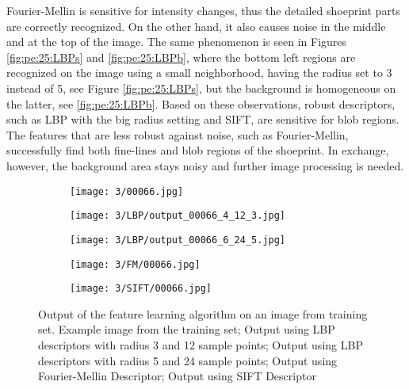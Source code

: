 \documentclass[draft,final]{vutinfth} %
\begin{document}
Fourier-Mellin is sensitive for intensity changes, thus the detailed shoeprint parts are correctly recognized.
On the other hand, it also causes noise in the middle and at the top of the image.
The same phenomenon is seen in Figures  \ref{fig:pe:25:LBPs} and  \ref{fig:pe:25:LBPb}, where the bottom left regions are recognized on the image using a small neighborhood, having the radius set to 3 instead of 5, see Figure \ref{fig:pe:25:LBPs}, but the background is homogeneous on the latter, see \ref{fig:pe:25:LBPb}. 
Based on these observations, robust descriptors, such as LBP with the big radius setting and SIFT, are sensitive for blob regions.
The features that are less robust against noise, such as Fourier-Mellin, successfully find both fine-lines and blob regions of the shoeprint.
In exchange, however, the background area stays noisy and further image processing is needed.

\begin{figure}[h]
  \centering
  \begin{subfigure}[t]{0.19\columnwidth}
    \centering
    \texttt{[image: 3/00066.jpg]}
    \subcaption{}
    \label{fig:pe:66:orig}
  \end{subfigure}
  \begin{subfigure}[t]{0.19\columnwidth}
    \centering
    \texttt{[image: 3/LBP/output\_00066\_4\_12\_3.jpg]}
    \subcaption{}
    \label{fig:pe:66:LBPs}
  \end{subfigure}
  \begin{subfigure}[t]{0.19\columnwidth}
    \centering
    \texttt{[image: 3/LBP/output\_00066\_6\_24\_5.jpg]}
    \subcaption{}
    \label{fig:pe:66:LBPb}
  \end{subfigure}
  \begin{subfigure}[t]{0.19\columnwidth}
    \centering
    \texttt{[image: 3/FM/00066.jpg]}
    \subcaption{}
    \label{fig:pe:66:FM}
  \end{subfigure}
  \begin{subfigure}[t]{0.19\columnwidth}
    \centering
    \texttt{[image: 3/SIFT/00066.jpg]}
    \subcaption{}
    \label{fig:pe:66:SIFT}
  \end{subfigure}
  \caption{Output of the feature learning algorithm on an image from training set.  Example image from the training set;  Output using LBP descriptors with radius 3 and 12 sample points;  Output using LBP descriptors with radius 5 and 24 sample points;  Output using Fourier-Mellin Descriptor;  Output using SIFT Descriptor}
  \label{fig:pe:66}
\end{figure}
\end{document}
